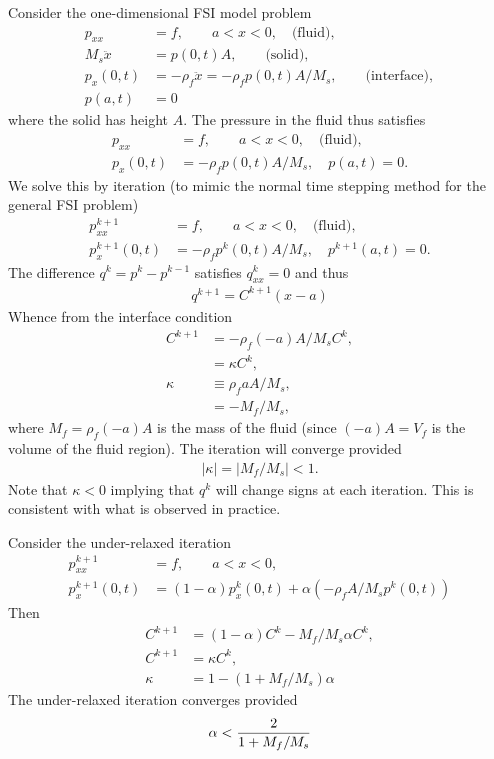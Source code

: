 Consider the one-dimensional FSI model problem
\begin{align}
   p_{xx} & = f, \qquad a < x < 0 , \quad \text{(fluid)}, \\
   M_s \ddot{x} &= p(0,t)  A , \qquad \text{(solid)}, \\
   p_x(0,t) &= -\rho_f \ddot{x} = -\rho_f p(0,t) A/M_s,  \qquad \text{(interface)},\\
   p(a,t) &=0 
\end{align}
where the solid has height $A$. 
The pressure in the fluid thus satisfies
\begin{align}
   p_{xx} & = f, \qquad a < x < 0 , \quad \text{(fluid)} ,\\
   p_x(0,t) &= -\rho_f p(0,t) A/M_s , \quad p(a,t) =0 .
\end{align}
We solve this by iteration (to mimic the normal time stepping method for the general FSI problem) 
\begin{align}
   p^{k+1}_{xx} & = f, \qquad a < x < 0 , \quad \text{(fluid)}, \\
   p^{k+1}_x(0,t) &= -\rho_f p^k(0,t) A/M_s , \quad p^{k+1}(a,t) =0 .
\end{align}
The difference $q^{k} = p^{k}-p^{k-1}$  satisfies $q^{k}_{xx}=0$ and thus
\begin{align}
   q^{k+1} = C^{k+1}(x-a)
\end{align}
Whence from the interface condition
\begin{align}
    C^{k+1} & = -\rho_f (-a)  A/M_s C^k , \\
            &= \kappa C^k, \\
   \kappa &\equiv \rho_f a A/M_s ,\\
          &= - M_f/M_s ,
\end{align}
where $M_f = \rho_f (-a) A$ is the mass of the fluid (since $(-a) A = V_f$ is the volume of the fluid region). 
The iteration will converge provided
\begin{align}
   \vert \kappa \vert = \vert M_f/M_s \vert <1 .
\end{align}
Note that $\kappa<0$ implying that $q^k$ will change signs at each iteration. This is consistent with 
what is observed in practice.

Consider the under-relaxed iteration
\begin{align}
   p^{k+1}_{xx} & = f, \qquad a < x < 0 ,  \\
   p^{k+1}_x(0,t) &= (1-\alpha) p^k_x(0,t)  + \alpha  (-\rho_f  A/M_s  p^k(0,t) ) 
\end{align}
Then
\begin{align}
   C^{k+1} & = (1-\alpha) C^{k} - M_f/M_s  \alpha C^k, \\
   C^{k+1} & = \kappa C^k , \\
      \kappa &= 1- (1+M_f/M_s)\alpha 
\end{align}
The under-relaxed iteration converges provided
\begin{align}
   \alpha < {2\over 1+ M_f/M_s} 
\end{align}
